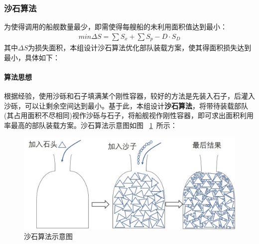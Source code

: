 \documentclass{whutmod}
\begin{document}
    	  \subsubsection{沙石算法}

		为使得调用的船舰数量最少，即需使得每艘船的未利用面积值达到最小：
	    \begin{gather}
		min \Delta S= \sum  S_{x} + \sum  S_{p}-D\cdot S_{D} 
		\end{gather}
	其中$\Delta S$为损失面积，本组设计沙石算法优化部队装载方案，使其得面积损失达到最小，具体如下：
	 \paragraph{算法思想}
	 根据经验，使用沙砾和石子填满某个刚性容器，较好的方法是先装入石子，后灌入沙砾，可以让剩余空间达到最小。基于此，本组设计\textbf{沙石算法}，将带待装载部队(其占用面积不尽相同)视作沙砾与石子，将船舰视作刚性容器，即可求出面积利用率最高的部队装载方案。沙石算法示意图如图 ~\ref{shashi}~所示：
	 
	 
	 \begin{figure}[H]
	 	\centering
	 	\includegraphics[width=.8\textwidth]{figures/shashi.jpg}
	 	\caption{沙石算法示意图}\label{shashi}
	 \end{figure}
	 
\end{document}
